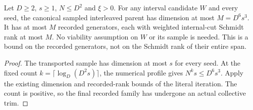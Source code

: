 \begin{lemma}
    \label{lem:canonical_interleaved_parent_unconditional_profile}
    \leanok
    Let $D\ge2$, $s\ge1$, $N\le D^2$ and $\xi>0$. For any interval
    candidate $W$ and every seed, the canonical sampled interleaved parent
    has dimension at most $M=D^6s^3$. It has at most $M$ recorded generators,
    each with weighted internal-cut Schmidt rank at most $M$.
    No viability assumption on $W$ or its sample is needed. This is a
    bound on the recorded generators, not on the Schmidt rank of their
    entire span.
\end{lemma}
\begin{proof}\leanok
    The transported sample has dimension at most $s$ for every seed.
    At the fixed count $k=\lceil\log_D(D^2s)\rceil$, the numerical profile
    gives $N^ks\le D^6s^3$. Apply the existing dimension and recorded-rank
    bounds of the literal iteration. The count is positive, so the final
    recorded family has undergone an actual collective trim.
\end{proof}

